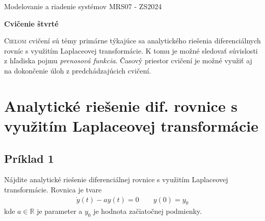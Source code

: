 \documentclass[a4paper, 10pt, ]{article}
\def\oznacenieCasti{MRS07 - ZS2024}
\begin{document}
\lstset{%
style=mystyle,
rangebeginprefix=\#\#\#\ cellB\ ,%
rangebeginsuffix=\ \#\#\#,%
rangeendprefix=\#\#\#\ cellE\ ,%
rangeendsuffix=\ \#\#\#,%
includerangemarker=false,
}






\fontsize{12pt}{22pt}\selectfont

\centerline{\textsf{Modelovanie a riadenie systémov} \hfill \textsf{\oznacenieCasti}}

\fontsize{18pt}{22pt}\selectfont





\begin{flushleft}
	\textbf{\textsf{Cvičenie štvrté}}
\end{flushleft}






\normalsize

\bigskip

{\hypersetup{hidelinks}

\tableofcontents

}

\bigskip

\vspace{18pt}



\noindent
\lettrine[lines=3, nindent=0pt]{C}{ieľom} cvičení sú témy primárne týkajúce sa analytického riešenia diferenciálnych rovníc s využitím Laplaceovej transformácie. K tomu je možné sledovať súvislosti z hľadiska pojmu \emph{prenosová funkcia}. Časový priestor cvičení je možné využiť aj na dokončenie úloh z predchádzajúcich cvičení.




\section{Analytické riešenie dif. rovnice s využitím Laplaceovej transformácie}


\subsection{Príklad 1}

Nájdite analytické riešenie diferenciálnej rovnice s využitím Laplaceovej transformácie. Rovnica je tvare
\begin{align}
    \dot y(t) - a y(t) = 0 \qquad y(0) = y_0
\end{align}
kde $a \in \mathbb R$ je parameter a $y_0$ je hodnota začiatočnej podmienky. 
\end{document}
